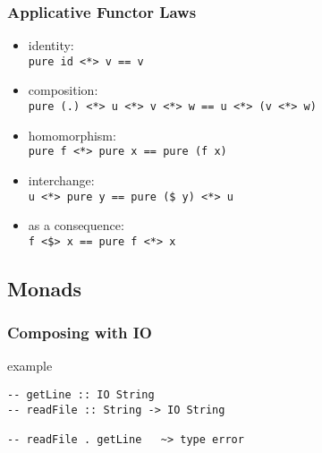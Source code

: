 \documentclass[dvipsnames]{beamer}
\theoremstyle{plain}
\begin{document}
\begin{frame}
  \frametitle{Applicative Functor Laws}

  \begin{itemize}
    \item identity:\\
      \lstinline|pure id <*> v == v|

    \medskip
    \item composition:\\
      \lstinline|pure (.) <*> u <*> v <*> w == u <*> (v <*> w)|

    \medskip
    \item homomorphism:\\
      \lstinline|pure f <*> pure x == pure (f x)|

    \medskip
    \item interchange:\\
      \lstinline|u <*> pure y == pure ($ y) <*> u|

    \pause
    \medskip
    \item as a consequence:\\
      \lstinline|f <$> x == pure f <*> x|
  \end{itemize}
\end{frame}

\subsection{Monads}

\begin{frame}[fragile]
  \frametitle{Composing with IO}

  \begin{exampleblock}{example}
    \begin{lstlisting}
-- getLine :: IO String
-- readFile :: String -> IO String

-- readFile . getLine   ~> type error
    \end{lstlisting}
  \end{exampleblock}
\end{frame}
\end{document}
